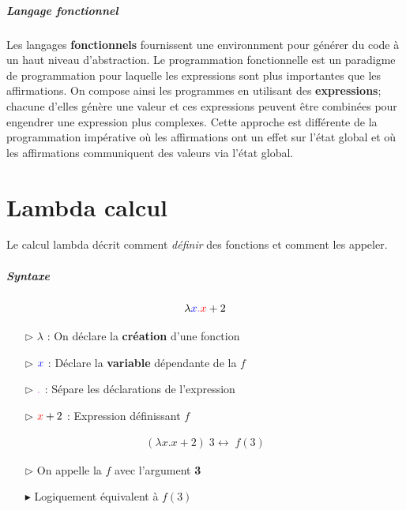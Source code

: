 \documentclass{report}
\begin{document}
\begin{multicols*}{3}
    \paragraph{Langage fonctionnel}
    Les langages \textbf{fonctionnels} fournissent une environnment pour générer
    du code à un haut niveau d'abstraction. Le programmation fonctionnelle est
    un paradigme de programmation pour laquelle les expressions sont plus
    importantes que les affirmations. On compose ainsi les programmes en
    utilisant des \textbf{expressions}; chacune d'elles génère une valeur et ces
    expressions peuvent être combinées pour engendrer une expression plus
    complexes. Cette approche est différente de la programmation impérative où
    les affirmations ont un effet sur l'état global et où les affirmations
    communiquent des valeurs via l'état global. 
    
    \chapter{Lambda calcul}
    Le calcul lambda décrit comment \textit{définir} des fonctions et comment les 
    appeler.
    \paragraph{Syntaxe}
    \begin{align*}
          \lambda \textcolor{blue}{x}\textcolor{myp}{.} 
          \textcolor{red}{x} + 2    
    \end{align*}
    \begin{itemize}
      \item [$\rhd$] $\lambda$ : On déclare la \textbf{création} d'une fonction  
      \item [$\rhd$] $\textcolor{blue}{x}$ : Déclare la \textbf{variable}
        dépendante de la $f$ 
      \item [$\rhd$] $\textcolor{myp}{.}  $ : Sépare les déclarations de l'expression 
      \item [$\rhd$] $\textcolor{red}{x} + 2$ : Expression définissant $f$  
    \end{itemize}

    \begin{align*}
        (\lambda x. x + 2) \; 3 \leftrightarrow \; f(3)
    \end{align*}


    \begin{itemize}
      \item [$\rhd$] On appelle la $f$ avec l'argument \textbf{3}  
      \item[$\blacktriangleright$] Logiquement équivalent à $f(3)$
    \end{itemize}


\end{multicols*}
\end{document}
